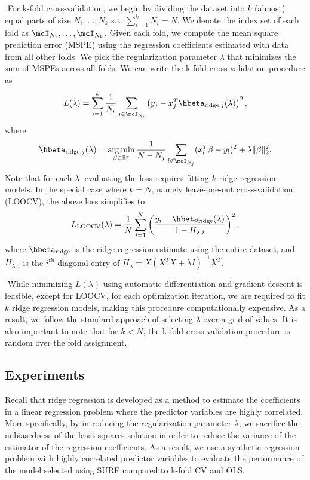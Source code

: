 $ $\newline
For k-fold cross-validation, we begin by dividing the dataset into $k$ (almost) equal parts of size $N_1,\dots, N_k$ s.t. $\sum_{i=1}^k N_i = N$. We denote the index set of each fold as $\mcI_{N_1}, \dots, \mcI_{N_k}$. Given each fold, we compute the mean square prediction error (MSPE) using the regression coefficients estimated with data from all other folds. We pick the regularization parameter $\lambda$ that minimizes the sum of MSPEs across all folds. We can write the k-fold cross-validation procedure as
\[
L(\lambda) = \sum_{i=1}^k \frac{1}{N_i} \sum_{j \in \mcI_{N_i}} \left(y_j - x_j^T\hbeta_{\text{ridge}, j}(\lambda)\right)^2,
\] 
where
\[
\hbeta_{\text{ridge}, j}(\lambda) = \argmin_{\beta\in\reals^p} \frac{1}{N-N_j}\sum_{l\notin\mcI_{N_j}}(x_l^T\beta - y_l)^2 + \lambda \|\beta\|_2^2.
\]
Note that for each $\lambda$, evaluating the loss requires fitting $k$ ridge regression models. In the special case where $k=N$, namely leave-one-out cross-validation (LOOCV), the above loss simplifies to
\[
L_{\text{LOOCV}}(\lambda) = \frac{1}{N}\sum_{i=1}^N \left( \frac{y_i - \hbeta_{\text{ridge}}(\lambda)}{1 - H_{\lambda,i}} \right)^2,
\]
where $\hbeta_{\text{ridge}}$ is the ridge regression estimate using the entire dataset, and $H_{\lambda,i}$ is the $i^\text{th}$ diagonal entry of $H_\lambda = X(X^TX + \lambda I)^{-1}X^T$.

$ $\newline
While minimizing $L(\lambda)$ using automatic differentiation and gradient descent is feasible, except for LOOCV, for each optimization iteration, we are required to fit $k$ ridge regression models, making this procedure computationally expensive. As a result, we follow the standard approach of selecting $\lambda$ over a grid of values. It is also important to note that for $k<N$, the k-fold cross-validation procedure is random over the fold assignment.

\subsection{Experiments}
Recall that ridge regression is developed as a method to estimate the coefficients in a linear regression problem where the predictor variables are highly correlated. More specifically, by introducing the regularization parameter $\lambda$, we sacrifice the unbiasedness of the least squares solution in order to reduce the variance of the estimator of the regression coefficients. As a result, we use a synthetic regression problem with highly correlated predictor variables to evaluate the performance of the model selected using SURE compared to k-fold CV and OLS.

